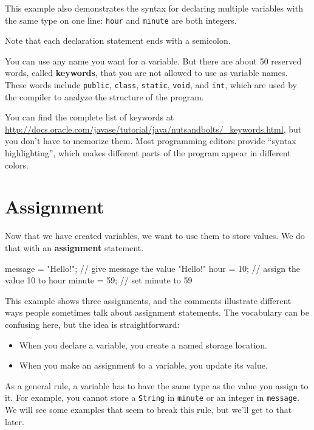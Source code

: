 \documentclass[12pt]{book}
\theoremstyle{exercise}
\newcommand{\java}[1]{\verb"#1"}
\begin{document}
This example also demonstrates the syntax for declaring multiple variables with the same type on one line: \java{hour} and \java{minute} are both integers.

Note that each declaration statement ends with a semicolon.

You can use any name you want for a variable.
But there are about 50 reserved words, called {\bf keywords}, that you are not allowed to use as variable names.
These words include \java{public}, \java{class}, \java{static}, \java{void}, and \java{int}, which are used by the compiler to analyze the structure of the program.

You can find the complete list of keywords at \url{http://docs.oracle.com/javase/tutorial/java/nutsandbolts/_keywords.html}, but you don't have to memorize them.
Most programming editors provide ``syntax highlighting'', which makes different parts of the program appear in different colors.


\section{Assignment}


Now that we have created variables, we want to use them to store values.
We do that with an {\bf assignment} statement.

\begin{code}
    message = "Hello!";  // give message the value "Hello!"
    hour = 10;           // assign the value 10 to hour
    minute = 59;         // set minute to 59
\end{code}

This example shows three assignments, and the comments illustrate different ways people sometimes talk about assignment statements.
The vocabulary can be confusing here, but the idea is straightforward:

\begin{itemize}
\item When you declare a variable, you create a named storage location.
\item When you make an assignment to a variable, you update its value.
\end{itemize}

As a general rule, a variable has to have the same type as the value you assign to it.
For example, you cannot store a \java{String} in \java{minute} or an integer in \java{message}.
We will see some examples that seem to break this rule, but we'll get to that later.
\end{document}
